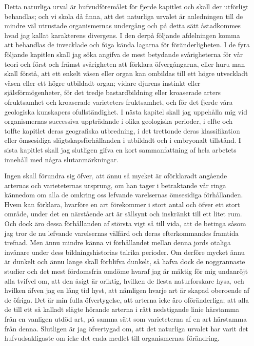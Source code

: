 Detta naturliga urval är hufvudföremålet för fjerde kapitlet och skall der utförligt behandlas; och vi skola då finna, att det naturliga urvalet är anledningen till de mindre väl utrustade organismernas undergång och på detta sätt åstadkommes hvad jag kallat karakterens divergens. I den derpå följande afdelningen komma att behandlas de invecklade och föga kända lagarna för föränderligheten. I de fyra följande kapitlen skall jag söka angifva de mest betydande svårigheterna för vår teori och först och främst svårigheten att förklara öfvergångarna, eller huru man skall förstå, att ett enkelt väsen eller organ kan ombildas till ett högre utveckladt väsen eller ett högre utbildadt organ; vidare djurens instinkt eller själsförmögenheter, för det tredje bastardbildning eller kroaserade arters ofruktsamhet och kroaserade varieteters fruktsamhet, och för det fjerde våra geologiska kunskapers ofullständighet. I nästa kapitel skall jag uppehålla mig vid organismernas successiva uppträdande i olika geologiska perioder, i elfte och tolfte kapitlet deras geografiska utbredning, i det trettonde deras klassifikation eller ömsesidiga slägtskapsförhållanden i utbildadt och i embryonalt tillstånd. I sista kapitlet skall jag slutligen gifva en kort sammanfattning af hela arbetets innehåll med några slutanmärkningar.

Ingen skall förundra sig öfver, att ännu så mycket är oförklaradt angående arternas och varieteternas ursprung, om han tager i betraktande vår ringa kännedom om alla de omkring oss lefvande varel\-sernas ömsesidiga förhållanden. Hvem kan förklara, hvarföre en art förekommer i stort antal och öfver ett stort område, under det en närstående art är sällsynt och inskränkt till ett litet rum. Och dock äro dessa förhållanden af största vigt så till vida, att de betinga såsom jag tror de nu lefvande varelsernas välfärd och deras efterkommandes framtida trefnad. Men ännu mindre känna vi förhållandet mellan denna jords otaliga invånare under dess bildningshistorias talrika perioder. Om derföre mycket ännu är dunkelt och ännu länge skall förblifva dunkelt, så hafva dock de noggrannaste studier och det mest fördomsfria omdöme hvaraf jag är mäktig för mig undanröjt alla tvifvel om, att den åsigt är oriktig, hvilken de flesta naturforskare hysa, och hvilken äfven jag en lång tid hyst, att nämligen hvarje art är skapad oberoende af de öfriga. Det är min fulla öfvertygelse, att arterna icke äro oföränderliga; att alla de till ett så kalladt slägte hörande arterna i rätt nedstigande linie härstamma från en vanligen utdöd art, på samma sätt som varieteterna af en art härstamma från denna. Slutligen är jag öfvertygad om, att det naturliga urvalet har varit det hufvudsakligaste om icke det enda medlet till organismernas förändring.


